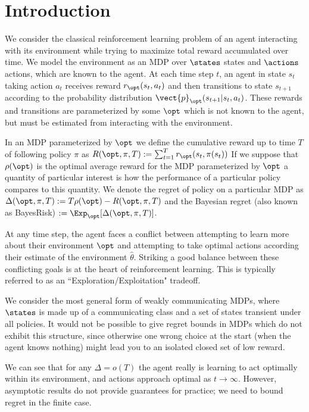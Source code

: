 \section{Introduction}
We consider the classical reinforcement learning problem of an agent interacting with its environment while trying to maximize total reward accumulated over time. We model the environment as an MDP over $\states$ states and $\actions$ actions, which are known to the agent. At each time step $t$, an agent in state $s_t$ taking action $a_t$ receives reward $r_{\opt}(s_t,a_t)$ and then transitions to state $s_{t+1}$ according to the probability distribution $\vect{p}_{\opt}(s_{t+1} | s_t,a_t)$. These rewards and transitions are parameterized by some $\opt$ which is not known to the agent, but must be estimated from interacting with the environment.

In an MDP parameterized by $\opt$ we define the cumulative reward up to time $T$ of following policy $\pi$ as
$ R (\opt, \pi, T) := \sum_{t=1}^T r_{\opt}(s_t,\pi(s_t)) $
If we suppose that $\rho(\opt)$ is the optimal average reward for the MDP parameterized by $\opt$ a quantity of particular interest is how the performance of a particular policy compares to this quantity. We denote the regret of policy on a particular MDP as
$\Delta (\opt, \pi, T) := T \rho(\opt) - R(\opt, \pi, T)$
and the Bayesian regret (also known as BayesRisk) $ := \Exp_{\opt}[\Delta (\opt, \pi, T)]$.

At any time step, the agent faces a conflict between attempting to learn more about their environment $\opt$ and attempting to take optimal actions according their estimate of the environment $\hat{\theta}$. Striking a good balance between these conflicting goals is at the heart of reinforcement learning. This is typically referred to as an ``Exploration/Exploitation" tradeoff.

We consider the most general form of weakly communicating MDPs, where $\states$ is made up of a communicating class and a set of states transient under all policies. It would not be possible to give regret bounds in MDPs which do not exhibit this structure, since otherwise one wrong choice at the start (when the agent knows nothing) might lead you to an isolated closed set of low reward.

We can see that for any $\Delta = o(T)$ the agent really is learning to act optimally within its environment, and actions approach optimal as $t \to \infty$. However, asymptotic results do not provide guarantees for practice; we need to bound regret in the finite case.

